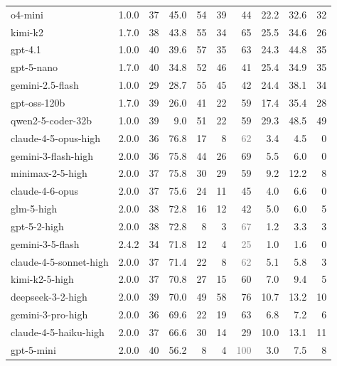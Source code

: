 {\begin{tabular}{@{}lrrrrrrrrr@{}}
o4-mini & 1.0.0 & 37 & 45.0 & 54 & 39 & 44 & 22.2 & 32.6 & 32 \\
kimi-k2 & 1.7.0 & 38 & 43.8 & 55 & 34 & 65 & 25.5 & 34.6 & 26 \\
gpt-4.1 & 1.0.0 & 40 & 39.6 & 57 & 35 & 63 & 24.3 & 44.8 & 35 \\
gpt-5-nano & 1.7.0 & 40 & 34.8 & 52 & 46 & 41 & 25.4 & 34.9 & 35 \\
gemini-2.5-flash & 1.0.0 & 29 & 28.7 & 55 & 45 & 42 & 24.4 & 38.1 & 34 \\
gpt-oss-120b & 1.7.0 & 39 & 26.0 & 41 & 22 & 59 & 17.4 & 35.4 & 28 \\
qwen2-5-coder-32b & 1.0.0 & 39 & 9.0 & 51 & 22 & 59 & 29.3 & 48.5 & 49 \\
\midrule
claude-4-5-opus-high & 2.0.0 & 36 & 76.8 & 17 & 8 & \textcolor{gray}{62} & 3.4 & 4.5 & 0 \\
gemini-3-flash-high & 2.0.0 & 36 & 75.8 & 44 & 26 & 69 & 5.5 & 6.0 & 0 \\
minimax-2-5-high & 2.0.0 & 37 & 75.8 & 30 & 29 & 59 & 9.2 & 12.2 & 8 \\
claude-4-6-opus & 2.0.0 & 37 & 75.6 & 24 & 11 & 45 & 4.0 & 6.6 & 0 \\
glm-5-high & 2.0.0 & 38 & 72.8 & 16 & 12 & 42 & 5.0 & 6.0 & 5 \\
gpt-5-2-high & 2.0.0 & 38 & 72.8 & 8 & 3 & \textcolor{gray}{67} & 1.2 & 3.3 & 3 \\
gemini-3-5-flash & 2.4.2 & 34 & 71.8 & 12 & 4 & \textcolor{gray}{25} & 1.0 & 1.6 & 0 \\
claude-4-5-sonnet-high & 2.0.0 & 37 & 71.4 & 22 & 8 & \textcolor{gray}{62} & 5.1 & 5.8 & 3 \\
kimi-k2-5-high & 2.0.0 & 37 & 70.8 & 27 & 15 & 60 & 7.0 & 9.4 & 5 \\
deepseek-3-2-high & 2.0.0 & 39 & 70.0 & 49 & 58 & 76 & 10.7 & 13.2 & 10 \\
gemini-3-pro-high & 2.0.0 & 36 & 69.6 & 22 & 19 & 63 & 6.8 & 7.2 & 6 \\
claude-4-5-haiku-high & 2.0.0 & 37 & 66.6 & 30 & 14 & 29 & 10.0 & 13.1 & 11 \\
gpt-5-mini & 2.0.0 & 40 & 56.2 & 8 & 4 & \textcolor{gray}{100} & 3.0 & 7.5 & 8 \\
\bottomrule
\end{tabular}
}
